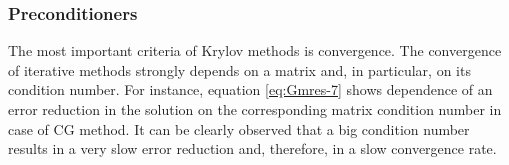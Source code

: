 













\subsubsection{Preconditioners}
\label{subseq:iterative-preconditioners}
The most important criteria of Krylov methods is convergence. The convergence of iterative methods strongly depends on a matrix and, in particular, on its condition number. For instance, equation \ref{eq:Gmres-7} shows dependence of an error reduction in the solution on the corresponding matrix condition number in case of CG method. It can be clearly observed that a big condition number results in a very slow error reduction and, therefore, in a slow convergence rate.\\

